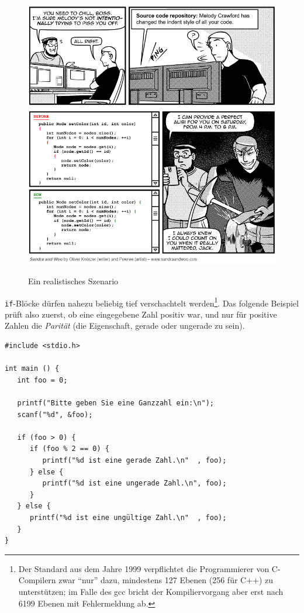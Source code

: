 \begin{figure}
	\href{http://www.sandraandwoo.com/2015/04/13/0674-there-are-10-types-of-programmers/}{
		\includegraphics[width=\linewidth]{./gfx/SW-indent-style}
	}
	\caption{Ein realistisches Szenario} \label{fig:IndentStyle}
\end{figure}

\texttt{if}-Blöcke dürfen nahezu beliebig tief verschachtelt werden\footnote{Der Standard aus dem Jahre 1999 verpflichtet die Programmierer von C-Compilern zwar \enquote{nur} dazu, mindestens 127 Ebenen (256 für C++) zu unterstützen; im Falle des gcc bricht der Kompiliervorgang aber erst nach 6199 Ebenen mit Fehlermeldung ab.}. Das folgende Beispiel prüft also zuerst, ob eine eingegebene Zahl positiv war, und nur für positive Zahlen die \emph{Parität} (die Eigenschaft, gerade oder ungerade zu sein).

\begin{codebox}
\begin{verbatim}
#include <stdio.h>

int main () {
   int foo = 0;

   printf("Bitte geben Sie eine Ganzzahl ein:\n");
   scanf("%d", &foo);

   if (foo > 0) {
      if (foo % 2 == 0) {
         printf("%d ist eine gerade Zahl.\n"  , foo);
      } else {
         printf("%d ist eine ungerade Zahl.\n", foo);
      }
   } else {
      printf("%d ist eine ungültige Zahl.\n"  , foo);
   }
}
\end{verbatim}
\end{codebox}


